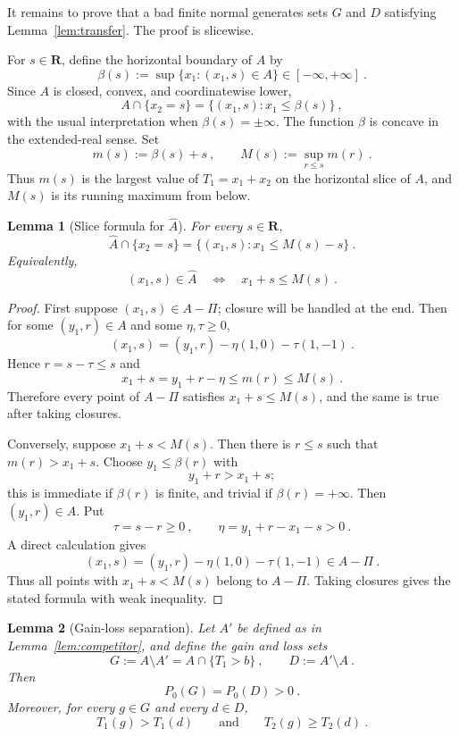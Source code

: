 \documentclass[12pt]{article}
\newtheorem{lemma}{Lemma}
\theoremstyle{remark}
\begin{document}
It remains to prove that a bad finite normal generates sets $G$ and $D$ satisfying Lemma~\ref{lem:transfer}.  The proof is slicewise.

For $s\in\mathbf R$, define the horizontal boundary of $A$ by
\[
\beta(s):=\sup\{x_1:(x_1,s)\in A\}\in[-\infty,+\infty]~.
\]
Since $A$ is closed, convex, and coordinatewise lower,
\[
A\cap\{x_2=s\}=\{(x_1,s):x_1\le \beta(s)\}~,
\]
with the usual interpretation when $\beta(s)=\pm\infty$.  The function $\beta$ is concave in the extended-real sense.  Set
\[
m(s):=\beta(s)+s~,
\qquad
M(s):=\sup_{r\le s}m(r)~.
\]
Thus $m(s)$ is the largest value of $T_1=x_1+x_2$ on the horizontal slice of $A$, and $M(s)$ is its running maximum from below.

\begin{lemma}[Slice formula for $\widehat A$]\label{lem:slice-formula}
For every $s\in\mathbf R$,
\[
\widehat A\cap\{x_2=s\}
=
\{(x_1,s):x_1\le M(s)-s\}~.
\]
Equivalently,
\[
(x_1,s)\in\widehat A
\quad\Longleftrightarrow\quad
x_1+s\le M(s)~.
\]
\end{lemma}

\begin{proof}
First suppose $(x_1,s)\in A-\Pi$; closure will be handled at the end.  Then for some $(y_1,r)\in A$ and some $\eta,\tau\ge0$,
\[
(x_1,s)=(y_1,r)-\eta(1,0)-\tau(1,-1)~.
\]
Hence $r=s-\tau\le s$ and
\[
x_1+s=y_1+r-\eta\le m(r)\le M(s)~.
\]
Therefore every point of $A-\Pi$ satisfies $x_1+s\le M(s)$, and the same is true after taking closures.

Conversely, suppose $x_1+s<M(s)$.  Then there is $r\le s$ such that $m(r)>x_1+s$.  Choose $y_1\le\beta(r)$ with
\[
y_1+r>x_1+s;
\]
this is immediate if $\beta(r)$ is finite, and trivial if $\beta(r)=+\infty$.  Then $(y_1,r)\in A$.  Put
\[
\tau=s-r\ge0~,
\qquad
\eta=y_1+r-x_1-s>0~.
\]
A direct calculation gives
\[
(x_1,s)=(y_1,r)-\eta(1,0)-\tau(1,-1)\in A-\Pi~.
\]
Thus all points with $x_1+s<M(s)$ belong to $A-\Pi$.  Taking closures gives the stated formula with weak inequality.
\end{proof}

\begin{lemma}[Gain-loss separation]\label{lem:gain-loss}
Let $A'$ be defined as in Lemma~\ref{lem:competitor}, and define the gain and loss sets
\[
G:=A\setminus A'=A\cap\{T_1>b\}~,
\qquad
D:=A'\setminus A~.
\]
Then
\[
P_0(G)=P_0(D)>0~.
\]
Moreover, for every $g\in G$ and every $d\in D$,
\[
T_1(g)>T_1(d)
\qquad\text{and}\qquad
T_2(g)\ge T_2(d)~.
\]
\end{lemma}
\end{document}
